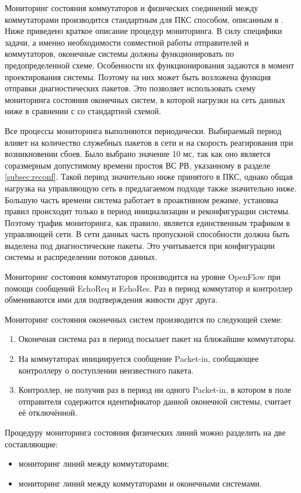 \documentclass[12pt, a4paper]{article}
\begin{document}
Мониторинг состояния коммутаторов и физических соединений между коммутаторами производится стандартным для ПКС способом, описанным в \cite{monitor1, monitor2}. Ниже приведено краткое описание процедур мониторинга. В силу специфики задачи, а именно необходимости совместной работы отправителей и коммутаторов, оконечные системы должны функционировать по предопределенной схеме. Особенности их функционирования задаются в момент проектирования системы. Поэтому на них может быть возложена функция отправки диагностических пакетов. Это позволяет использовать схему мониторинга состояния оконечных систем, в которой нагрузки на сеть данных ниже в сравнении с со стандартной схемой.

Все процессы мониторинга выполняются периодически. Выбираемый период влияет на количество служебных пакетов в сети и на скорость реагирования при возникновении сбоев. Было выбрано значение 10 мс, так как оно является соразмерным допустимому времени простоя ВС РВ, указанному в разделе \ref{subsec:reconf}. Такой период значительно ниже принятого в ПКС, однако общая нагрузка на управляющую сеть в предлагаемом подходе также значительно ниже. Большую часть времени система работает в проактивном режиме, установка правил происходит только в период инициализации и реконфигурации системы. Поэтому трафик мониторинга, как правило, является единственным трафиком в управляющей сети. В сети данных часть пропускной способности должна быть выделена под диагностические пакеты. Это учитывается при конфигурации системы и распределении потоков данных.

Мониторинг состояния коммутаторов производится на уровне OpenFlow при помощи сообщений EchoReq и EchoRes. Раз в период коммутатор и контроллер обмениваются ими для подтверждения живости друг друга.

Мониторинг состояния оконечных систем производится по следующей схеме:
\begin{enumerate}
	\item Оконечная система раз в период посылает пакет на ближайшие коммутаторы.
	\item На коммутаторах инициируется сообщение Packet-in, сообщающее контроллеру о поступлении неизвестного пакета.
	\item Контроллер, не получив раз в период ни одного Packet-in, в котором в поле отправителя содержится идентификатор данной оконечной системы, считает её отключённой.
\end{enumerate}


Процедуру мониторинга состояния физических линий можно разделить на две составляющие: 
\begin{itemize}
	\item мониторинг линий между коммутаторами;
	\item мониторинг линий между коммутаторами и оконечными системами.
\end{itemize}
\end{document}
